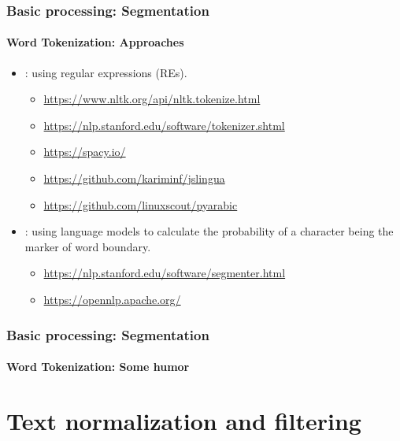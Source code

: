 \documentclass[xcolor=table]{beamer}
\begin{document}
\begin{frame}
\frametitle{Basic processing: Segmentation}
\framesubtitle{Word Tokenization: Approaches}

\begin{itemize}
	\item {}: using regular expressions (REs).
	\begin{itemize}
		\item \url{https://www.nltk.org/api/nltk.tokenize.html}
		\item \url{https://nlp.stanford.edu/software/tokenizer.shtml}
		\item \url{https://spacy.io/}
		\item \url{https://github.com/kariminf/jslingua}
		\item \url{https://github.com/linuxscout/pyarabic}
	\end{itemize}
	\item {}: using language models to calculate the probability of a character being the marker of word boundary.
	\begin{itemize}
		\item \url{https://nlp.stanford.edu/software/segmenter.html}
		\item \url{https://opennlp.apache.org/}
	\end{itemize}
\end{itemize}

\end{frame}

\begin{frame}
\frametitle{Basic processing: Segmentation}
\framesubtitle{Word Tokenization: Some humor}

\begin{center}
\end{center}

\end{frame}


\section{Text normalization and filtering}
\end{document}
